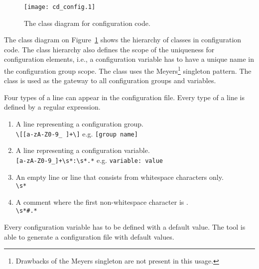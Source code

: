\begin{figure}[h!]
\caption{The class diagram for configuration code.}
\label{cd-configuration}
\vspace{0.5cm}
\centering
\texttt{[image: cd\_config.1]}
\end{figure}

The class diagram on Figure~\ref{cd-configuration} shows the hierarchy of classes in configuration code. The class hierarchy also defines the scope of the uniqueness for configuration elements, i.e., a configuration variable has to have a unique name in the configuration group scope. The  class uses the Meyers\footnote{Drawbacks of the Meyers singleton are not present in this usage.} singleton pattern. The class is used as the gateway to all configuration groups and variables.

Four types of a line can appear in the configuration file. Every type of a line is defined by a regular expression.

\begin{enumerate}
\item{A line representing a configuration group.\\ \verb$\[[a-zA-Z0-9_ ]+\]$ e.g. \verb$[group name]$}  
\item{A line representing a configuration variable. \\ \verb$[a-zA-Z0-9_]+\s*:\s*.*$ e.g. \verb$variable: value$}
\item{An empty line or line that consists from whitespace characters only. \\ \verb$\s*$}
\item{A comment where the first non-whitespace character is \code{\#}. \\ \verb$\s*#.*$}
\end{enumerate}

Every configuration variable has to be defined with a default value. The tool is able to generate a configuration file with default values.
